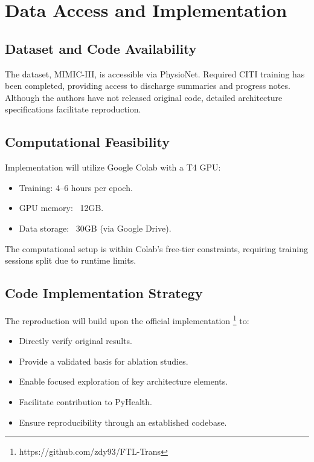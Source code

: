 \documentclass[twocolumn]{article}
\begin{document}
\section{Data Access and Implementation}

\subsection{Dataset and Code Availability}

The dataset, MIMIC-III, is accessible via PhysioNet. Required CITI training has been completed, providing access to discharge summaries and progress notes. Although the authors have not released original code, detailed architecture specifications facilitate reproduction.

\subsection{Computational Feasibility}

Implementation will utilize Google Colab with a T4 GPU:
\begin{itemize}
    \item Training: 4–6 hours per epoch.
    \item GPU memory: ~12GB.
    \item Data storage: ~30GB (via Google Drive).
\end{itemize}

The computational setup is within Colab's free-tier constraints, requiring training sessions split due to runtime limits.

\subsection{Code Implementation Strategy}

The reproduction will build upon the official implementation \footnote{https://github.com/zdy93/FTL-Trans} to:
\begin{itemize}
    \item Directly verify original results.
    \item Provide a validated basis for ablation studies.
    \item Enable focused exploration of key architecture elements.
    \item Facilitate contribution to PyHealth.
    \item Ensure reproducibility through an established codebase.
\end{itemize}
\end{document}
